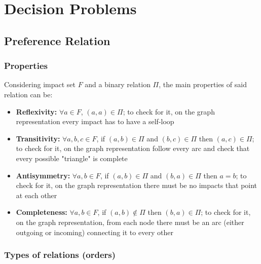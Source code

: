 \section{Decision Problems}

\subsection{Preference Relation}

\subsubsection{Properties}

Considering impact set $F$ and a binary relation $\Pi$, the main properties of said relation can be:
\begin{itemize}
	\item \textbf{Reflexivity:} $\forall a \in F$, $(a,a) \in \Pi$; to check for it, on the graph representation every impact has to have a self-loop
	
	\item \textbf{Transitivity:} $\forall a,b,c \in F$, if $(a,b) \in \Pi$ and $(b,c) \in \Pi$ then $(a,c) \in \Pi$; to check for it, on the graph representation follow every arc and check that every possible "triangle" is complete
	
	\item \textbf{Antisymmetry:} $\forall a,b \in F$, if $(a,b) \in \Pi$ and $(b,a) \in \Pi$ then $a = b$; to check for it, on the graph representation there must be no impacts that point at each other
	
	\item \textbf{Completeness:} $\forall a,b \in F$, if $(a,b) \notin \Pi$ then $(b, a) \in \Pi$; to check for it, on the graph representation, from each node there must be an arc (either outgoing or incoming) connecting it to every other
\end{itemize}

\subsubsection{Types of relations (orders)}

